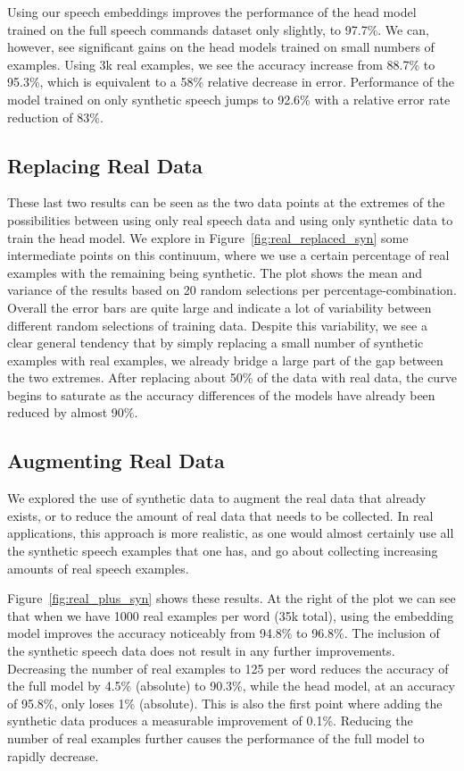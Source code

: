 \documentclass{article}
\begin{document}
Using our speech embeddings improves the performance of the head model trained on the full speech commands dataset only slightly, to 97.7\%. We can, however, see significant gains on the head models trained on small numbers of examples. Using 3k real examples, we see the accuracy increase from 88.7\% to 95.3\%, which is equivalent to a 58\% relative decrease in error. Performance of the model trained on only synthetic speech jumps to 92.6\% with a relative error rate reduction of 83\%.

\subsection{Replacing Real Data}
These last two results can be seen as the two data points at the extremes of the possibilities between using only real speech data and using only synthetic data to train the head model. We explore in Figure~\ref{fig:real_replaced_syn} some intermediate points on this continuum, where we use a certain percentage of real examples with the remaining being synthetic. The plot shows the mean and variance of the results based on 20 random selections per percentage-combination. Overall the error bars are quite large and indicate a lot of variability between different random selections of training data. Despite this variability, we see a clear general tendency that by simply replacing a small number of synthetic examples with real examples, we already bridge a large part of the gap between the two extremes. After replacing about 50\% of the data with real data, the curve begins to saturate as the accuracy differences of the models have already been reduced by almost 90\%.




\subsection{Augmenting Real Data}
We explored the use of synthetic data to augment the real data that already exists, or to reduce the amount of real data that needs to be collected. In real applications, this approach is more realistic, as one would almost certainly use all the synthetic speech examples that one has, and go about collecting increasing amounts of real speech examples.



Figure~\ref{fig:real_plus_syn} shows these results. At the right of the plot we can see that when we have 1000 real examples per word (35k total), using the embedding model improves the accuracy noticeably from 94.8\% to 96.8\%. The inclusion of the synthetic speech data does not result in any further improvements. Decreasing the number of real examples to 125 per word reduces the accuracy of the full model by 4.5\% (absolute) to 90.3\%, while the head model, at an accuracy of 95.8\%, only loses 1\% (absolute). This is also the first point where adding the synthetic data produces a measurable improvement of 0.1\%. Reducing the number of real examples further causes the performance of the full model to rapidly decrease.
\end{document}
